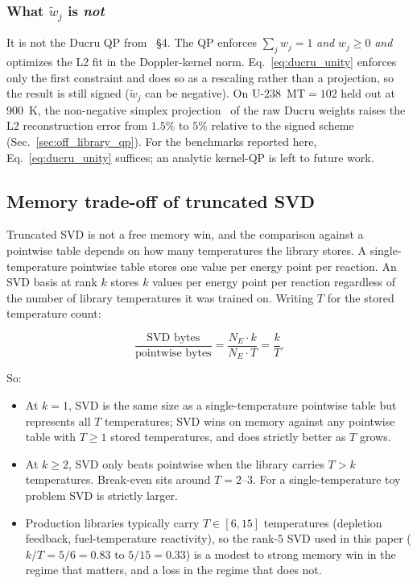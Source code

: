 \subsubsection*{What $\tilde w_j$ is \emph{not}}

It is not the Ducru QP from~\cite{ducru2017} §4. The QP
enforces $\sum_j w_j = 1$ \emph{and} $w_j \geq 0$
\emph{and} optimizes the L2 fit in the Doppler-kernel
norm. Eq.~\ref{eq:ducru_unity} enforces only the first
constraint and does so as a rescaling rather than a
projection, so the result is still signed
($\tilde w_j$ can be negative). On U-$238$~MT$=102$ held
out at $900$~K, the non-negative simplex
projection~\cite{duchi2008simplex} of the raw Ducru
weights raises the L2 reconstruction error from $1.5\%$ to
$5\%$ relative to the signed scheme
(Sec.~\ref{sec:off_library_qp}). For the benchmarks
reported here, Eq.~\ref{eq:ducru_unity} suffices; an
analytic kernel-QP is left to future work.

\subsection{Memory trade-off of truncated SVD}
\label{sec:svd_tradeoff}

Truncated SVD is not a free memory win, and the comparison
against a pointwise table depends on how many temperatures
the library stores. A single-temperature pointwise table
stores one value per energy point per reaction. An SVD basis
at rank $k$ stores $k$ values per energy point per reaction
regardless of the number of library temperatures it was
trained on. Writing $T$ for the stored temperature count:

\begin{equation}
\frac{\text{SVD bytes}}{\text{pointwise bytes}}
= \frac{N_E \cdot k}{N_E \cdot T}
= \frac{k}{T}.
\label{eq:svd_pt_ratio}
\end{equation}

So:
\begin{itemize}
\item At $k = 1$, SVD is the same size as a
  single-temperature pointwise table but represents all $T$
  temperatures; SVD wins on memory against any pointwise
  table with $T \geq 1$ stored temperatures, and does
  strictly better as $T$ grows.
\item At $k \geq 2$, SVD only beats pointwise when the
  library carries $T > k$ temperatures. Break-even sits
  around $T = 2$--$3$. For a single-temperature toy
  problem SVD is strictly larger.
\item Production libraries typically carry $T \in [6, 15]$
  temperatures (depletion feedback, fuel-temperature
  reactivity), so the rank-$5$ SVD used in this paper
  ($k/T = 5/6 = 0.83$ to $5/15 = 0.33$) is a modest to
  strong memory win in the regime that matters, and a loss
  in the regime that does not.
\end{itemize}

